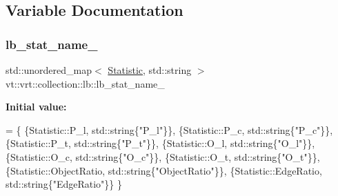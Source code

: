 \subsection{Variable Documentation}
\mbox{\label{namespacevt_1_1vrt_1_1collection_1_1lb_a93087d8eb275a6113b9d32e41ef87277}} 
\subsubsection{\texorpdfstring{lb\+\_\+stat\+\_\+name\+\_\+}{lb\_stat\_name\_}}
{\footnotesize\ttfamily std\+::unordered\+\_\+map$<$ \hyperlink{namespacevt_1_1vrt_1_1collection_1_1lb_af0e20ef9afee77295053aa83bf1348b1}{Statistic}, std\+::string $>$ vt\+::vrt\+::collection\+::lb\+::lb\+\_\+stat\+\_\+name\+\_\+}

{\bfseries Initial value\+:}
\begin{DoxyCode}
= \{
  \{Statistic::P\_l,         std::string\{\textcolor{stringliteral}{"P\_l"}\}\},
  \{Statistic::P\_c,         std::string\{\textcolor{stringliteral}{"P\_c"}\}\},
  \{Statistic::P\_t,         std::string\{\textcolor{stringliteral}{"P\_t"}\}\},
  \{Statistic::O\_l,         std::string\{\textcolor{stringliteral}{"O\_l"}\}\},
  \{Statistic::O\_c,         std::string\{\textcolor{stringliteral}{"O\_c"}\}\},
  \{Statistic::O\_t,         std::string\{\textcolor{stringliteral}{"O\_t"}\}\},
  \{Statistic::ObjectRatio, std::string\{\textcolor{stringliteral}{"ObjectRatio"}\}\},
  \{Statistic::EdgeRatio,   std::string\{\textcolor{stringliteral}{"EdgeRatio"}\}\}
\}
\end{DoxyCode}

